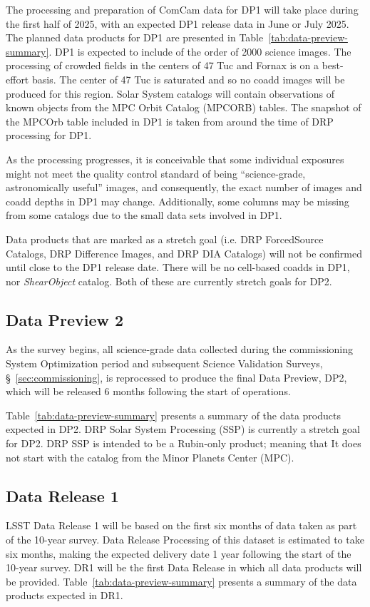 The  processing and preparation of ComCam data for DP1 will take place during the first half of 2025, with an expected DP1 release data in June or July 2025. 
The planned data products for DP1 are presented in Table~\ref{tab:data-preview-summary}.
DP1 is expected to include of the order of 2000 science images.
The processing of crowded fields in the centers of 47 Tuc and Fornax is on a best-effort basis.
The center of 47 Tuc is saturated and so no coadd images will be produced for this region.
Solar System catalogs will contain observations of known objects from the MPC Orbit Catalog (MPCORB) tables.
The snapshot of the MPCOrb table included in DP1 is taken from  around the time of DRP processing for DP1. 

As the processing progresses, it is conceivable that some individual exposures might not meet the quality control standard of being ``science-grade, astronomically useful'' images, and consequently, the exact number of images  and coadd depths in DP1 may change.
Additionally, some columns may be missing from some catalogs due to the small data sets involved in DP1.

Data products that are marked as a stretch goal (i.e. DRP ForcedSource Catalogs, DRP Difference Images, and DRP DIA Catalogs) will not be confirmed until close to the DP1 release date.
There will be no cell-based coadds in DP1, nor \textit{ShearObject} catalog.
Both of these are currently stretch goals for DP2.
		
\subsection{Data Preview 2}
\label{ssec:dp2}

As the survey begins, all science-grade data collected during the commissioning System Optimization period and subsequent Science Validation Surveys, \S~\ref{sec:commissioning}, is reprocessed to produce the final Data Preview, DP2, which will be released 6 months following the start of operations.

Table~\ref{tab:data-preview-summary} presents a summary of the data products expected in DP2.
DRP Solar System Processing (SSP)  is currently a stretch goal for DP2. 
DRP SSP is intended to be a Rubin-only product; meaning that  It does not start with the catalog from the Minor Planets Center (MPC).


\subsection{Data Release 1}
\label{ssec:dr1}

LSST Data Release 1 will be based on the first six months of data taken as part of the 10-year survey. 
Data Release Processing of this dataset is estimated to take six months, making the expected delivery date 1 year following the start of the 10-year survey.
DR1 will be the first Data Release in which all data products will be provided.
Table~\ref{tab:data-preview-summary} presents a summary of the data products expected in DR1.



